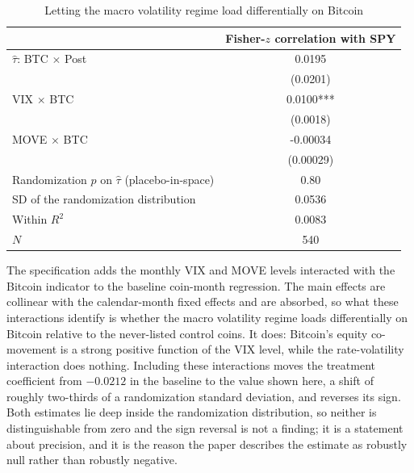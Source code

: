 \begin{table}[t]
\centering
\begin{threeparttable}
\caption{Letting the macro volatility regime load differentially on Bitcoin}
\label{tab:macro}
\begin{tabular}{lc}
\toprule
 & Fisher-$z$ correlation with SPY \\
\midrule
$\hat\tau$: BTC $\times$ Post & 0.0195 \\
 & (0.0201) \\
VIX $\times$ BTC & 0.0100*** \\
 & (0.0018) \\
MOVE $\times$ BTC & -0.00034 \\
 & (0.00029) \\
Randomization $p$ on $\hat\tau$ (placebo-in-space) & 0.80 \\
SD of the randomization distribution & 0.0536 \\
Within $R^2$ & 0.0083 \\
$N$ & 540 \\
\bottomrule
\end{tabular}
\begin{tablenotes}[flushleft]
\footnotesize
\item The specification adds the monthly VIX and MOVE levels interacted with the Bitcoin indicator to the baseline coin-month regression. The main effects are collinear with the calendar-month fixed effects and are absorbed, so what these interactions identify is whether the macro volatility regime loads differentially on Bitcoin relative to the never-listed control coins. It does: Bitcoin's equity co-movement is a strong positive function of the VIX level, while the rate-volatility interaction does nothing. Including these interactions moves the treatment coefficient from $-0.0212$ in the baseline to the value shown here, a shift of roughly two-thirds of a randomization standard deviation, and reverses its sign. Both estimates lie deep inside the randomization distribution, so neither is distinguishable from zero and the sign reversal is not a finding; it is a statement about precision, and it is the reason the paper describes the estimate as robustly null rather than robustly negative.
\end{tablenotes}
\end{threeparttable}
\end{table}
